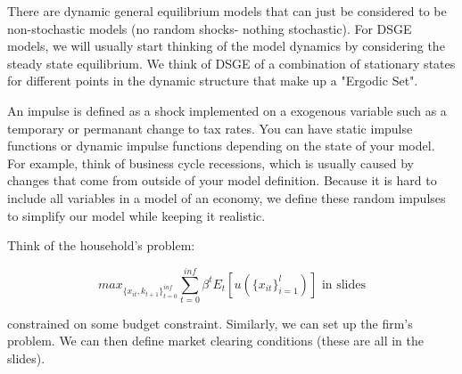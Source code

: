 \documentclass[a4paper]{article}
\begin{document}
There are dynamic general equilibrium models that can just be considered to be non-stochastic models (no random shocks- nothing stochastic). For DSGE models, we will usually start thinking of the model dynamics by considering the steady state equilibrium. We think of DSGE of a combination of stationary states for different points in the dynamic structure that make up a "Ergodic Set".

An impulse is defined as a shock implemented on a exogenous variable such as a temporary or permanant change to tax rates. You can have static impulse functions or dynamic impulse functions depending on the state of your model. For example, think of business cycle recessions, which is usually caused by changes that come from outside of your model definition. Because it is hard to include all variables in a model of an economy, we define these random impulses to simplify our model while keeping it realistic.

Think of the household's problem:

$$max_{\{x_{it}, k_{t+1}\}_{t=0}^{inf}} \sum_{t=0}^{inf}\beta^t E_t[u(\{x_{it}\}_{i=1}^l)] \text{  in slides}$$

constrained on some budget constraint. Similarly, we can set up the firm's problem. We can then define market clearing conditions (these are all in the slides).
\end{document}
